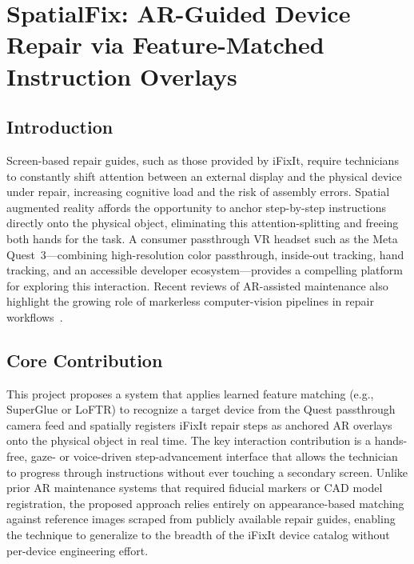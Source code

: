 \documentclass{styling/vgtc}                          %
\begin{document}
\section{SpatialFix: AR-Guided Device Repair via Feature-Matched Instruction Overlays}

\subsection{Introduction}

Screen-based repair guides, such as those provided by iFixIt, require
technicians to constantly shift attention between an external display and the
physical device under repair, increasing cognitive load and the risk of
assembly errors. Spatial augmented reality affords the opportunity to anchor
step-by-step instructions directly onto the physical object, eliminating this
attention-splitting and freeing both hands for the task. A consumer passthrough
VR headset such as the Meta Quest~3---combining high-resolution color
passthrough, inside-out tracking, hand tracking, and an accessible developer
ecosystem---provides a compelling platform for exploring this interaction. Recent
reviews of AR-assisted maintenance also highlight the growing role of markerless
computer-vision pipelines in repair workflows~\cite{malta2023maintenance}.

\subsection{Core Contribution}

This project proposes a system that applies learned feature matching
(e.g., SuperGlue or LoFTR) to recognize a target device from the Quest
passthrough camera feed and spatially registers iFixIt repair steps as
anchored AR overlays onto the physical object in real time. The key
interaction contribution is a hands-free, gaze- or voice-driven
step-advancement interface that allows the technician to progress through
instructions without ever touching a secondary screen. Unlike prior AR
maintenance systems that required fiducial markers or CAD model registration,
the proposed approach relies entirely on appearance-based matching against
reference images scraped from publicly available repair guides, enabling the
technique to generalize to the breadth of the iFixIt device catalog without
per-device engineering effort.
\end{document}
